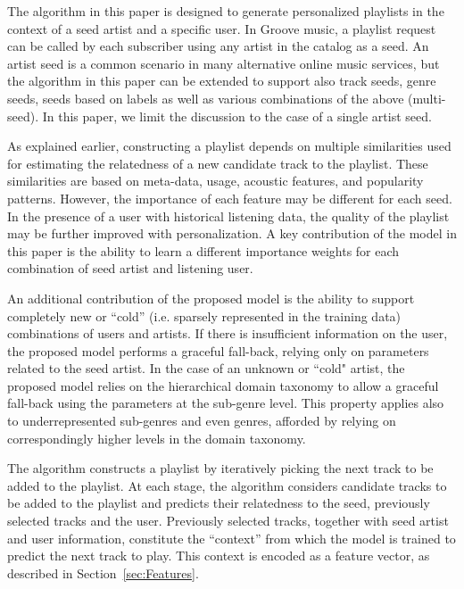 \label{sec:OurModel}
The algorithm in this paper is designed to generate personalized playlists in the context of a seed artist and a specific user. In Groove music, a playlist request can be called by each subscriber using any artist in the catalog as a seed. An artist seed is a common scenario in many alternative online music services, but the algorithm in this paper can be extended to support also track seeds, genre seeds, seeds based on labels as well as various combinations of the above (multi-seed). In this paper, we limit the discussion to the case of a single artist seed.

As explained earlier, constructing a playlist depends on multiple similarities used for estimating the relatedness of a new candidate track to the playlist. These similarities are based on meta-data, usage, acoustic features, and popularity patterns. 
However, the importance of each feature may be different for each seed. 
In the presence of a user with historical listening data, the quality of the playlist may be further improved with personalization. 
A key contribution of the model in this paper is the ability to learn a different importance weights for each combination of seed artist and listening user. 

An additional contribution of the proposed model is the ability to support completely new or ``cold'' (i.e. sparsely represented in the training data) combinations of users and artists. If there is insufficient information on the user, the proposed model performs a graceful fall-back, relying only on parameters related to the seed artist. In the case of an unknown or ``cold" artist, the proposed model relies on the hierarchical domain taxonomy to allow a graceful fall-back using the parameters at the sub-genre level. This property applies also to underrepresented sub-genres and even genres, afforded by relying on correspondingly higher levels in the domain taxonomy. 


The algorithm constructs a playlist by iteratively picking the next track to be added to the playlist. 
At each stage, the algorithm considers candidate tracks to be added to the playlist and predicts their relatedness to the seed, previously selected tracks and the user. 
Previously selected tracks, together with seed artist and user information, constitute the ``context'' from which the model is trained to predict the next track to play. This context is encoded as a feature vector, as described in Section~\ref{sec:Features}.  

